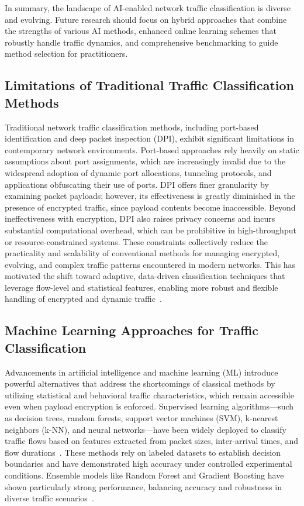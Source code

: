 \documentclass[sigconf]{acmart}
\begin{document}
In summary, the landscape of AI-enabled network traffic classification is diverse and evolving. Future research should focus on hybrid approaches that combine the strengths of various AI methods, enhanced online learning schemes that robustly handle traffic dynamics, and comprehensive benchmarking to guide method selection for practitioners.

\subsection{Limitations of Traditional Traffic Classification Methods}

Traditional network traffic classification methods, including port-based identification and deep packet inspection (DPI), exhibit significant limitations in contemporary network environments. Port-based approaches rely heavily on static assumptions about port assignments, which are increasingly invalid due to the widespread adoption of dynamic port allocations, tunneling protocols, and applications obfuscating their use of ports. DPI offers finer granularity by examining packet payloads; however, its effectiveness is greatly diminished in the presence of encrypted traffic, since payload contents become inaccessible. Beyond ineffectiveness with encryption, DPI also raises privacy concerns and incurs substantial computational overhead, which can be prohibitive in high-throughput or resource-constrained systems. These constraints collectively reduce the practicality and scalability of conventional methods for managing encrypted, evolving, and complex traffic patterns encountered in modern networks. This has motivated the shift toward adaptive, data-driven classification techniques that leverage flow-level and statistical features, enabling more robust and flexible handling of encrypted and dynamic traffic~\cite{ref51}.

\subsection{Machine Learning Approaches for Traffic Classification}

Advancements in artificial intelligence and machine learning (ML) introduce powerful alternatives that address the shortcomings of classical methods by utilizing statistical and behavioral traffic characteristics, which remain accessible even when payload encryption is enforced. Supervised learning algorithms—such as decision trees, random forests, support vector machines (SVM), k-nearest neighbors (k-NN), and neural networks—have been widely deployed to classify traffic flows based on features extracted from packet sizes, inter-arrival times, and flow durations~\cite{ref51}. These methods rely on labeled datasets to establish decision boundaries and have demonstrated high accuracy under controlled experimental conditions. Ensemble models like Random Forest and Gradient Boosting have shown particularly strong performance, balancing accuracy and robustness in diverse traffic scenarios~\cite{ref51}.
\end{document}
